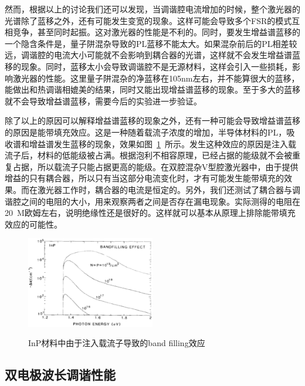 \documentclass{ZJUthesis}
\begin{document}
然而，根据以上的讨论我们还可以发现，当调谐腔电流增加的时候，整个激光器的光谱除了蓝移之外，还有可能发生变宽的现象。这样可能会导致多个FSR的模式互相竞争，甚至同时起振。这对激光器的性能是不利的。同时，要发生增益谱蓝移的一个隐含条件是，量子阱混杂导致的PL蓝移不能太大。如果混杂前后的PL相差较远，调谐腔的电流大小可能就不会影响到耦合器的光谱，这样就不会发生增益谱蓝移的现象。同时，蓝移太小会导致调谐腔不是无源材料，这样会引入一些损耗，影响激光器的性能。这里量子阱混杂的净蓝移在105nm左右，并不能算很大的蓝移，能做出和热调谐相媲美的结果，同时又能出现增益谱蓝移的现象。至于多大的蓝移就不会导致增益谱蓝移，需要今后的实验进一步验证。

除了以上的原因可以解释增益谱蓝移的现象之外，还有一种可能会导致增益谱蓝移的原因是能带填充效应。这是一种随着载流子浓度的增加，半导体材料的PL，吸收谱和增益谱发生蓝移的现象\cite{Holonyak1978Bandfilling}\cite{Tomita1987Carrier}\cite{Nagarajan1989Band}\cite{Bennett1990Carrier}\cite{Castrillo1995Band}，效果如图~\ref{fig_bandfilling}~所示。发生这种效应的原因是注入载流子后，材料的低能级被占满。根据泡利不相容原理，已经占据的能级就不会被重复占据，所以载流子只能占据更高的能级。在双腔混杂V型腔激光器中，由于提供增益的只有耦合器，所以只有当这部分电流变化时，才有可能发生能带填充的效果。而在激光器工作时，耦合器的电流是恒定的。另外，我们还测试了耦合器与调谐腔之间的电阻的大小，用来观察两者之间是否存在漏电现象。实际测得的电阻在20~M欧姆左右，说明绝缘性还是很好的。这样就可以基本从原理上排除能带填充效应的可能性。

\begin{figure}[htbp]
  \centering
  \includegraphics[width=0.5\textwidth]{./Pictures/bandfilling.eps}\\
  \caption{InP材料中由于注入载流子导致的band filling效应}
  \label{fig_bandfilling}
\end{figure}

\subsection{双电极波长调谐性能}
\end{document}
